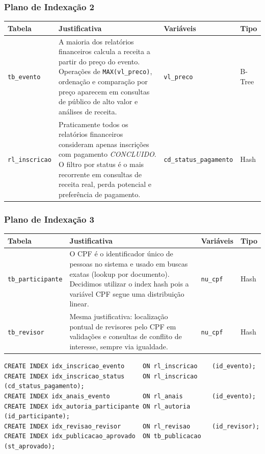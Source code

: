 \documentclass[12pt]{article}
\begin{document}
\subsubsection*{Plano de Indexação 2}
\begin{tabularx}{\textwidth}{|l|X|l|l|}
\hline
\textbf{Tabela} & \textbf{Justificativa} & \textbf{Variáveis} & \textbf{Tipo} \\
\hline
\texttt{tb\_evento} & A maioria dos relatórios financeiros calcula a receita a partir do preço do evento. Operações de \texttt{MAX(vl\_preco)}, ordenação e comparação por preço aparecem em consultas de público de alto valor e análises de receita. & \texttt{vl\_preco} & B-Tree \\
\hline
\texttt{rl\_inscricao} & Praticamente todos os relatórios financeiros consideram apenas inscrições com pagamento \textit{CONCLUIDO}. O filtro por status é o mais recorrente em consultas de receita real, perda potencial e preferência de pagamento. & \texttt{cd\_status\_pagamento} & Hash \\
\hline
\end{tabularx}

\bigskip
\subsubsection*{Plano de Indexação 3}
\begin{tabularx}{\textwidth}{|l|X|l|l|}
\hline
\textbf{Tabela} & \textbf{Justificativa} & \textbf{Variáveis} & \textbf{Tipo} \\
\hline
\texttt{tb\_participante} & O CPF é o identificador único de pessoas no sistema e usado em buscas exatas (lookup por documento). Decidimos utilizar o index hash pois a variável CPF segue uma distribuição linear. & \texttt{nu\_cpf} & Hash \\
\hline
\texttt{tb\_revisor} & Mesma justificativa: localização pontual de revisores pelo CPF em validações e consultas de conflito de interesse, sempre via igualdade. & \texttt{nu\_cpf} & Hash \\
\hline
\end{tabularx}

\begin{lstlisting}[caption={DDL dos índices.},label={lst:ddl-indices}]
CREATE INDEX idx_inscricao_evento     ON rl_inscricao    (id_evento);
CREATE INDEX idx_inscricao_status     ON rl_inscricao    (cd_status_pagamento);
CREATE INDEX idx_anais_evento         ON rl_anais        (id_evento);
CREATE INDEX idx_autoria_participante ON rl_autoria      (id_participante);
CREATE INDEX idx_revisao_revisor      ON rl_revisao      (id_revisor);
CREATE INDEX idx_publicacao_aprovado  ON tb_publicacao   (st_aprovado);
\end{lstlisting}
\end{document}
